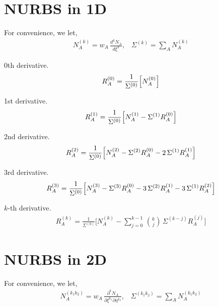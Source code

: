 \documentclass[oneside, english, reqno]{amsart}
\theoremstyle{plain}
\theoremstyle{plain}
\theoremstyle{plain}
\theoremstyle{plain}
\theoremstyle{definition}
\theoremstyle{definition}
\theoremstyle{definition}
\numberwithin{equation}{section}
\begin{document}
\section{NURBS in 1D}
\label{sec:1}
\noindent For convenience, we let,
\begin{align*}
	N_{A}^{(k)} = w_{A}\,\frac{d^{k}N_{A}}{d\xi^{k}},\,\,\,\,\,\Sigma^{(k)} = \sum_{A}N_{A}^{(k)}
\end{align*} \vspace{3pt}

\noindent 0th derivative.
\begin{align*}
	R_{A}^{(0)} = \frac{1}{\Sigma^{(0)}}\Bigl[N_{A}^{(0)}\Bigr]
\end{align*} \vspace{3pt}

\noindent 1st derivative.
\begin{align*}
	R_{A}^{(1)} = \frac{1}{\Sigma^{(0)}}\Bigl[N_{A}^{(1)} - \Sigma^{(1)}R_{A}^{(0)}\Bigr]
\end{align*} \vspace{3pt}

\noindent 2nd derivative.
\begin{align*}
	R_{A}^{(2)} = \frac{1}{\Sigma^{(0)}}\Bigl[N_{A}^{(2)} - \Sigma^{(2)}R_{A}^{(0)} - 2\,\Sigma^{(1)}R_{A}^{(1)}\Bigr]
\end{align*} \vspace{3pt}

\noindent 3rd derivative.
\begin{align*}
	R_{A}^{(3)} = \frac{1}{\Sigma^{(0)}}\Bigl[N_{A}^{(3)} - \Sigma^{(3)}R_{A}^{(0)} - 3\,\Sigma^{(2)}R_{A}^{(1)} - 3\,\Sigma^{(1)}R_{A}^{(2)}\Bigr]
\end{align*} \vspace{3pt}

\noindent \(k\)-th derivative.
\begin{align*}
	R_{A}^{(k)} = \frac{1}{\Sigma^{(0)}}\Biggl[N_{A}^{(k)} - \sum_{j = 0}^{k - 1}\,\binom{k}{j}\,\Sigma^{(k - j)}R_{A}^{(j)}\Biggr]
\end{align*}



\newpage
\section{NURBS in 2D}
\label{sec:2}
\noindent For convenience, we let,
\begin{align*}
	N_{A}^{(k_{1}k_{2})} = w_{A}\,\frac{\partial^{k}N_{A}}{\partial\xi^{k_{1}}\partial\eta^{k_{2}}},\,\,\,\,\,\Sigma^{(k_{1}k_{2})} = \sum_{A}N_{A}^{(k_{1}k_{2})}
\end{align*} \vspace{3pt}
\end{document}

